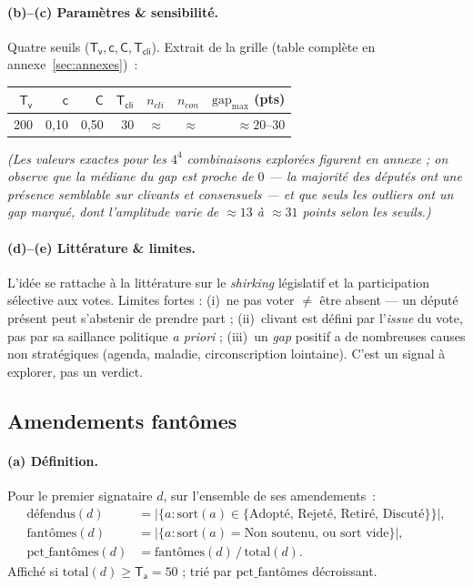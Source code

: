 \documentclass[11pt,a4paper]{article}
\newcommand{\param}[1]{\ensuremath{\mathsf{#1}}}
\begin{document}
\paragraph{(b)--(c) Paramètres \& sensibilité.} Quatre seuils ($\param{T_v},\param{c},\param{C},\param{T_{cli}}$).
Extrait de la grille (table complète en annexe~\ref{sec:annexes})~:
\begin{center}\small
\begin{tabular}{rrrr rrr}
\toprule
$\param{T_v}$ & $\param{c}$ & $\param{C}$ & $\param{T_{cli}}$ & $n_{cli}$ & $n_{con}$ & $\mathrm{gap}_{\max}$ (pts) \\
\midrule
200 & 0,10 & 0,50 & 30 & $\approx$ & $\approx$ & $\approx 20$--$30$ \\
\bottomrule
\end{tabular}
\end{center}
\emph{(Les valeurs exactes pour les $4^4$ combinaisons explorées figurent en
annexe ; on observe que la médiane du \emph{gap} est proche de $0$ — la majorité
des députés ont une présence semblable sur clivants et consensuels — et que seuls
les outliers ont un \emph{gap} marqué, dont l'amplitude varie de $\approx 13$ à
$\approx 31$ points selon les seuils.)}

\paragraph{(d)--(e) Littérature \& limites.} L'idée se rattache à la littérature
sur le \emph{shirking} législatif et la participation sélective aux votes. Limites
fortes : (i)~ne pas voter $\ne$ être absent — un député présent peut s'abstenir de
prendre part ; (ii)~\og{}clivant\fg{} est défini par l'\emph{issue} du vote, pas par
sa saillance politique \emph{a priori} ; (iii)~un \emph{gap} positif a de
nombreuses causes non stratégiques (agenda, maladie, circonscription lointaine).
C'est un signal à explorer, pas un verdict.

\subsection{Amendements \og{}fantômes\fg{}}\label{sec:fantomes}

\paragraph{(a) Définition.} Pour le premier signataire $d$, sur l'ensemble de ses
amendements~:
\[
\begin{aligned}
\text{défendus}(d) &= \big|\{a : \mathrm{sort}(a)\in\{\text{Adopté, Rejeté, Retiré, Discuté}\}\}\big|,\\[2pt]
\text{fantômes}(d) &= \big|\{a : \mathrm{sort}(a)=\text{Non soutenu, ou sort vide}\}\big|,\\[2pt]
\text{pct\_fantômes}(d) &= \text{fantômes}(d)\,/\,\text{total}(d).
\end{aligned}
\]
Affiché si $\text{total}(d)\ge \param{T_a}=50$ ; trié par $\text{pct\_fantômes}$
décroissant.
\end{document}
